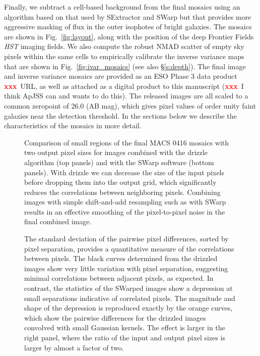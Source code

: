 \documentclass[preprint2]{aastex6}
\newcommand\xxx{{\textcolor{red}{\bf xxx}}}
\begin{document}
Finally, we subtract a cell-based background from the final mosaics using an algorithm based on that used by SExtractor and SWarp but that provides more aggressive masking of flux in the outer isophotes of bright galaxies. The mosaics are shown in Fig.~\ref{fig:layout}, along with the position of the deep Frontier Fields \textit{HST} imaging fields.  We also compute the robust NMAD scatter \citep{brammer:08} of empty sky pixels within the same cells to empirically calibrate the inverse variance maps that are shown in Fig.~\ref{fig:ivar_mosaics} (see also \S\ref{s:depth}).  The final image and inverse variance mosaics are provided as an ESO Phase 3 data product \xxx\ URL, as well as attached as a digital product to this manuscript (\xxx\ I think ApJSS can and wants to do this).  The released images are all scaled to a common zeropoint of 26.0 (AB mag), which gives pixel values of order unity faint galaxies near the detection threshold.  In the sections below we describe the characteristics of the mosaics in more detail.  


\begin{figure}[!t]
\caption{Comparison of small regions of the final MACS 0416 mosaics with two output pixel sizes for images combined with the drizzle algorithm (top panels) and with the SWarp software (bottom panels).  With drizzle we can decrease the size of the input pixels before dropping them into the output grid, which significantly reduces the correlations between neighboring pixels.  Combining images with simple shift-and-add resampling such as with SWarp results in an effective smoothing of the pixel-to-pixel noise in the final combined image. 
\label{fig:drizzle_cutout}}  
\end{figure}

\begin{figure}[!t]
\caption{The standard deviation of the pairwise pixel differences, sorted by pixel separation, provides a quantitative measure of the correlations between pixels.  The black curves determined from the drizzled images show very little variation with pixel separation, suggesting minimal correlations between adjacent pixels, as expected.  In contrast, the statistics of the SWarped images show a depression at small separations indicative of correlated pixels.  The magnitude and shape of the depression is reproduced exactly by the orange curves, which show the pairwise differences for the drizzled images convolved with small Gaussian kernels.  The effect is larger in the right panel, where the ratio of the input and output pixel sizes is larger by almost a factor of two.
\label{fig:corr_noise}}  
\end{figure}
\end{document}
